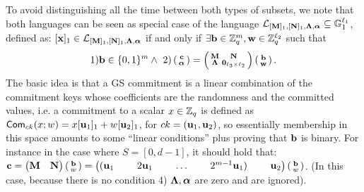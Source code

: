  To avoid distinguishing all the time between both types of subsets, we note that both languages can be seen as special case of the language 
 $\mathcal{L}_{[\mathbf{{M}}]_1,[\mathbf{{N}}]_1,\mathbf{{\Lambda}},{\boldsymbol \alpha}}\subseteq\mathbb{G}_1^{\ell_1}$, defined as: 
$[\mathbf{x}]_1\in\mathcal{L}_{[\mathbf{{M}}]_1,[\mathbf{{N}}]_1,\mathbf{{\Lambda}},{\boldsymbol \alpha}}$ if and only if $\exists \mathbf{b}\in \mathbb{Z}_q^{m},\mathbf{w}\in\mathbb{Z}_q^{\ell_2}$ such that
\begin{eqnarray*}
1) \mathbf{b}\in \{0,1\}^{m}
  \wedge \ 2)
\left(\begin{smallmatrix}
    \mathbf{c}\\
    {\boldsymbol \alpha}
\end{smallmatrix}\right)
=
\left(\begin{smallmatrix}
    \mathbf{{M}}       & \mathbf{{N}}\\
    \mathbf{{\Lambda}} & \mathbf{{0}}_{{\ell_3}\times {\ell_2}}
\end{smallmatrix}\right)
\left(\begin{smallmatrix}
    \mathbf{b}\\
    \mathbf{w}
\end{smallmatrix}\right).
\end{eqnarray*}
The basic idea is that a GS commitment is a linear combination of the commitment keys whose coefficients are the randomness and the committed values, i.e.  
a commitment to a scalar $x \in \mathbb{Z}_q$ is defined as $\mathsf{Com}_{ck}(x;w)=x [\mathbf{u}_1]_1+w [\mathbf{u}_2]_1$, for $ck=(\mathbf{u}_1,\mathbf{u}_2)$, so essentially membership in this space amounts to some ``linear conditions'' plus proving that $\mathbf{b}$ is binary. For instance in the case where $S=[0,d-1]$, it should hold that:
$
    \mathbf{c} = \left(\begin{matrix}\mathbf{{M}}&\mathbf{{N}}\end{matrix}\right)\left(\begin{smallmatrix}\mathbf{b}\\ w\end{smallmatrix}\right)
=
\begin{pmatrix}
    (\mathbf{u}_1 & \ &2 \mathbf{u}_1  &   \ & \ldots    & \  &  2^{m-1} \mathbf{u}_1)& \ &  \mathbf{u}_2
\end{pmatrix}
\left(\begin{smallmatrix}
    \mathbf{b}\\
    w
\end{smallmatrix}\right)$.
(In this case, because there is no condition 4) $\mathbf{{\Lambda}}, {\boldsymbol \alpha}$ are zero and are ignored). 


